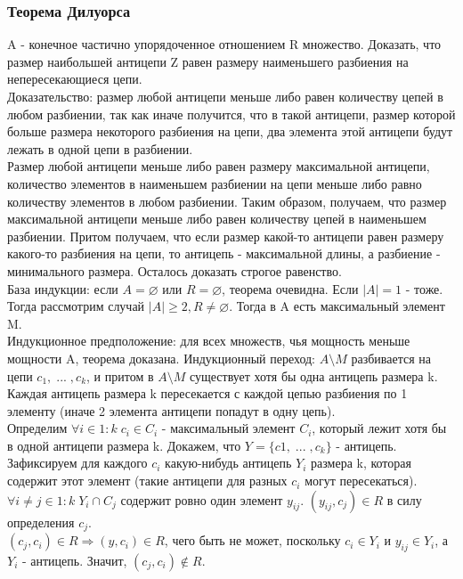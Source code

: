 \subsubsection{Теорема Дилуорса}
A - конечное частично упорядоченное отношением R множество. Доказать, что размер наибольшей антицепи Z равен размеру наименьшего разбиения на непересекающиеся цепи.\\
Доказательство: размер любой антицепи меньше либо равен количеству цепей в любом разбиении, так как иначе получится, что в такой антицепи, размер которой больше размера некоторого разбиения на цепи, два элемента этой антицепи будут лежать в одной цепи в разбиении.\\
Размер любой антицепи меньше либо равен размеру максимальной антицепи, количество элементов в наименьшем разбиении на цепи меньше либо равно количеству элементов в любом разбиении. Таким образом, получаем, что размер максимальной антицепи меньше либо равен количеству цепей в наименьшем разбиении. Притом получаем, что если размер какой-то антицепи равен размеру какого-то разбиения на цепи, то антицепь - максимальной длины, а разбиение - минимального размера. Осталось доказать строгое равенство.\\
База индукции: если $A = \varnothing$ или $R = \varnothing$, теорема очевидна. Если $|A| = 1$ - тоже. \\
Тогда рассмотрим случай $|A| \geq 2, R \not= \varnothing$. Тогда в A есть максимальный элемент M.\\
Индукционное предположение: для всех множеств, чья мощность меньше мощности A, теорема доказана.
Индукционный переход: $A \setminus {M}$ разбивается на цепи $c_1, \; ... \; , c_k$, и притом в $A \setminus {M}$ существует хотя бы одна антицепь размера k.\\
Каждая антицепь размера k пересекается с каждой цепью разбиения по 1 элементу (иначе 2 элемента антицепи попадут в одну цепь).\\
Определим $\forall i \in 1:k \; c_i \in C_i$ - максимальный элемент $C_i$, который лежит хотя бы в одной антицепи размера k. Докажем, что $Y = \{c1, \; ... \; , c_k\}$ - антицепь. \\
Зафиксируем для каждого $c_i$ какую-нибудь антицепь $Y_i$ размера k, которая содержит этот элемент (такие антицепи для разных $c_i$ могут пересекаться). $\forall i \not= j \in 1:k \; Y_i \cap C_j$ содержит ровно один элемент $y_{ij}$. $(y_{ij}, c_j) \in R$ в силу определения $c_j$. \\
$(c_j, c_i) \in R \Rightarrow (y, c_i) \in R$, чего быть не может, поскольку $c_i \in Y_i$ и $y_{ij} \in Y_i$, а $Y_i$ - антицепь. Значит, $(c_j, c_i) \not\in R$.\\
